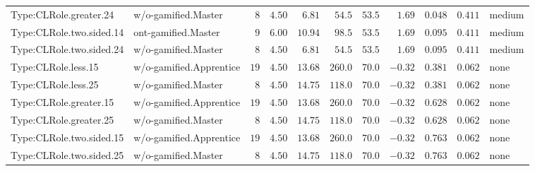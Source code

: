 \documentclass[6pt,a4paper]{article}
\begin{document}
{\begin{longtable}{llrrrrrrrrl}
Type:CLRole.greater.24&w/o-gamified.Master&$ 8$&$4.50$&$ 6.81$&$ 54.5$&$ 53.5$&$ 1.69$&$0.048$&$0.411$&medium\tabularnewline
Type:CLRole.two.sided.14&ont-gamified.Master&$ 9$&$6.00$&$10.94$&$ 98.5$&$ 53.5$&$ 1.69$&$0.095$&$0.411$&medium\tabularnewline
Type:CLRole.two.sided.24&w/o-gamified.Master&$ 8$&$4.50$&$ 6.81$&$ 54.5$&$ 53.5$&$ 1.69$&$0.095$&$0.411$&medium\tabularnewline
Type:CLRole.less.15&w/o-gamified.Apprentice&$19$&$4.50$&$13.68$&$260.0$&$ 70.0$&$-0.32$&$0.381$&$0.062$&none\tabularnewline
Type:CLRole.less.25&w/o-gamified.Master&$ 8$&$4.50$&$14.75$&$118.0$&$ 70.0$&$-0.32$&$0.381$&$0.062$&none\tabularnewline
Type:CLRole.greater.15&w/o-gamified.Apprentice&$19$&$4.50$&$13.68$&$260.0$&$ 70.0$&$-0.32$&$0.628$&$0.062$&none\tabularnewline
Type:CLRole.greater.25&w/o-gamified.Master&$ 8$&$4.50$&$14.75$&$118.0$&$ 70.0$&$-0.32$&$0.628$&$0.062$&none\tabularnewline
\newpage
Type:CLRole.two.sided.15&w/o-gamified.Apprentice&$19$&$4.50$&$13.68$&$260.0$&$ 70.0$&$-0.32$&$0.763$&$0.062$&none\tabularnewline
Type:CLRole.two.sided.25&w/o-gamified.Master&$ 8$&$4.50$&$14.75$&$118.0$&$ 70.0$&$-0.32$&$0.763$&$0.062$&none\tabularnewline
\hline
\end{longtable}}
\end{document}
